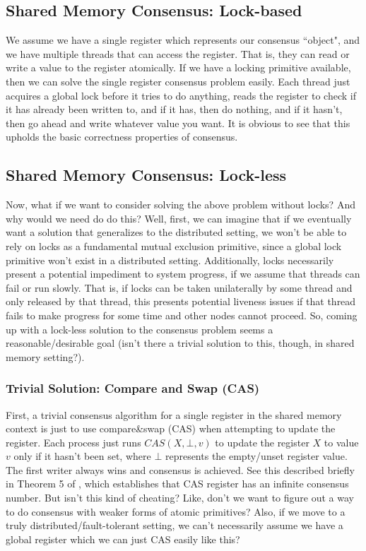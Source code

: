 \documentclass[10pt,a4paper]{article}
\begin{document}
\subsection{Shared Memory Consensus: Lock-based}

We assume we have a single register which represents our consensus ``object", and we have multiple threads that can access the register. That is, they can read or write a value to the register atomically. If we have a locking primitive available, then we can solve the single register consensus problem easily. Each thread just acquires a global lock before it tries to do anything, reads the register to check if it has already been written to, and if it has, then do nothing, and if it hasn't, then go ahead and write whatever value you want. It is obvious to see that this upholds the basic correctness properties of consensus. 

\subsection{Shared Memory Consensus: Lock-less}

Now, what if we want to consider solving the above problem without locks? And why would we need do do this? Well, first, we can imagine that if we eventually want a solution that generalizes to the distributed setting, we won't be able to rely on locks as a fundamental mutual exclusion primitive, since a global lock primitive won't exist in a distributed setting. Additionally, locks necessarily present a potential impediment to system progress, if we assume that threads can fail or run slowly. That is, if locks can be taken unilaterally by some thread and only released by that thread, this presents potential liveness issues if that thread fails to make progress for some time and other nodes cannot proceed. So, coming up with a lock-less solution to the consensus problem seems a reasonable/desirable goal (isn't there a trivial solution to this, though, in shared memory setting?).

\subsubsection{Trivial Solution: Compare and Swap (CAS)}

First, a trivial consensus algorithm for a single register in the shared memory context is just to use compare\&swap (CAS) when attempting to update the register. Each process just runs $CAS(X, \bot, v)$ to update the register $X$ to value $v$ only if it hasn't been set, where $\bot$ represents the empty/unset register value. The first writer always wins and consensus is achieved. See this described briefly in Theorem 5 of \cite{1991waitfreesync}, which establishes that CAS register has an infinite consensus number. But isn't this kind of cheating? Like, don't we want to figure out a way to do consensus with weaker forms of atomic primitives? Also, if we move to a truly distributed/fault-tolerant setting, we can't necessarily assume we have a global register which we can just CAS easily like this?
\end{document}
